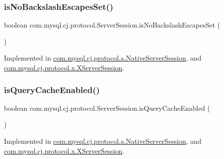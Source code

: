 \subsubsection{\texorpdfstring{is\+No\+Backslash\+Escapes\+Set()}{isNoBackslashEscapesSet()}}
{\footnotesize\ttfamily boolean com.\+mysql.\+cj.\+protocol.\+Server\+Session.\+is\+No\+Backslash\+Escapes\+Set (\begin{DoxyParamCaption}{ }\end{DoxyParamCaption})}



Implemented in \mbox{\hyperlink{classcom_1_1mysql_1_1cj_1_1protocol_1_1a_1_1_native_server_session_a649bec25ec5ac1c5084be7be5008844e}{com.\+mysql.\+cj.\+protocol.\+a.\+Native\+Server\+Session}}, and \mbox{\hyperlink{classcom_1_1mysql_1_1cj_1_1protocol_1_1x_1_1_x_server_session_a134bc8110f74e712e0944ae695809400}{com.\+mysql.\+cj.\+protocol.\+x.\+X\+Server\+Session}}.

\mbox{\label{interfacecom_1_1mysql_1_1cj_1_1protocol_1_1_server_session_ae4eabba31c09190939a9e1886466c72d}} 
\subsubsection{\texorpdfstring{is\+Query\+Cache\+Enabled()}{isQueryCacheEnabled()}}
{\footnotesize\ttfamily boolean com.\+mysql.\+cj.\+protocol.\+Server\+Session.\+is\+Query\+Cache\+Enabled (\begin{DoxyParamCaption}{ }\end{DoxyParamCaption})}



Implemented in \mbox{\hyperlink{classcom_1_1mysql_1_1cj_1_1protocol_1_1a_1_1_native_server_session_a60bae77bcda04aac21fbbc5a029b8174}{com.\+mysql.\+cj.\+protocol.\+a.\+Native\+Server\+Session}}, and \mbox{\hyperlink{classcom_1_1mysql_1_1cj_1_1protocol_1_1x_1_1_x_server_session_abf4e07003f9f0633af5a0957bb7a253d}{com.\+mysql.\+cj.\+protocol.\+x.\+X\+Server\+Session}}.

\mbox{\label{interfacecom_1_1mysql_1_1cj_1_1protocol_1_1_server_session_a021c8f114fce23443b9a8b26074b137a}} 
